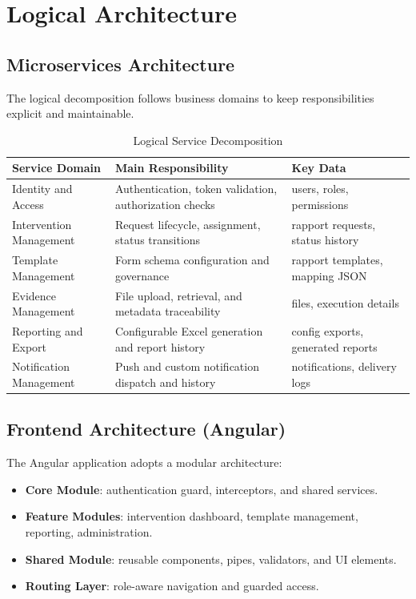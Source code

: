 \section{Logical Architecture}

\subsection{Microservices Architecture}

The logical decomposition follows business domains to keep responsibilities explicit and maintainable.

\begin{table}[H]
\centering
\caption{Logical Service Decomposition}
\label{tab:logical_services}
\begin{tabularx}{\textwidth}{|l|X|X|}
\hline
\textbf{Service Domain} & \textbf{Main Responsibility} & \textbf{Key Data} \\
\hline
Identity and Access & Authentication, token validation, authorization checks & users, roles, permissions \\
\hline
Intervention Management & Request lifecycle, assignment, status transitions & rapport requests, status history \\
\hline
Template Management & Form schema configuration and governance & rapport templates, mapping JSON \\
\hline
Evidence Management & File upload, retrieval, and metadata traceability & files, execution details \\
\hline
Reporting and Export & Configurable Excel generation and report history & config exports, generated reports \\
\hline
Notification Management & Push and custom notification dispatch and history & notifications, delivery logs \\
\hline
\end{tabularx}
\end{table}

\subsection{Frontend Architecture (Angular)}

The Angular application adopts a modular architecture:

\begin{itemize}
\item \textbf{Core Module}: authentication guard, interceptors, and shared services.
\item \textbf{Feature Modules}: intervention dashboard, template management, reporting, administration.
\item \textbf{Shared Module}: reusable components, pipes, validators, and UI elements.
\item \textbf{Routing Layer}: role-aware navigation and guarded access.
\end{itemize}

